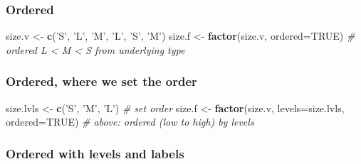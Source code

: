 \documentclass[
]{article}
\newenvironment{Shaded}{\begin{snugshade}}{\end{snugshade}}
\newcommand{\CommentTok}[1]{\textcolor[rgb]{0.56,0.35,0.01}{\textit{#1}}}
\newcommand{\DataTypeTok}[1]{\textcolor[rgb]{0.13,0.29,0.53}{#1}}
\newcommand{\KeywordTok}[1]{\textcolor[rgb]{0.13,0.29,0.53}{\textbf{#1}}}
\newcommand{\NormalTok}[1]{#1}
\newcommand{\OtherTok}[1]{\textcolor[rgb]{0.56,0.35,0.01}{#1}}
\newcommand{\StringTok}[1]{\textcolor[rgb]{0.31,0.60,0.02}{#1}}
\begin{document}
\hypertarget{ordered}{%
\subsubsection{Ordered}\label{ordered}}

\begin{Shaded}
\begin{Highlighting}[]
\NormalTok{size.v <-}\StringTok{ }\KeywordTok{c}\NormalTok{(}\StringTok{'S'}\NormalTok{, }\StringTok{'L'}\NormalTok{, }\StringTok{'M'}\NormalTok{, }\StringTok{'L'}\NormalTok{, }\StringTok{'S'}\NormalTok{, }\StringTok{'M'}\NormalTok{)}
\NormalTok{size.f <-}\StringTok{ }\KeywordTok{factor}\NormalTok{(size.v, }\DataTypeTok{ordered=}\OtherTok{TRUE}\NormalTok{)}
\CommentTok{# ordered L < M < S from underlying type}
\end{Highlighting}
\end{Shaded}

\hypertarget{ordered-where-we-set-the-order}{%
\subsubsection{Ordered, where we set the
order}\label{ordered-where-we-set-the-order}}

\begin{Shaded}
\begin{Highlighting}[]
\NormalTok{size.lvls <-}\StringTok{ }\KeywordTok{c}\NormalTok{(}\StringTok{'S'}\NormalTok{, }\StringTok{'M'}\NormalTok{, }\StringTok{'L'}\NormalTok{) }\CommentTok{# set order}
\NormalTok{size.f <-}\StringTok{ }\KeywordTok{factor}\NormalTok{(size.v, }\DataTypeTok{levels=}\NormalTok{size.lvls, }\DataTypeTok{ordered=}\OtherTok{TRUE}\NormalTok{)}
\CommentTok{# above: ordered (low to high) by levels}
\end{Highlighting}
\end{Shaded}

\hypertarget{ordered-with-levels-and-labels}{%
\subsubsection{Ordered with levels and
labels}\label{ordered-with-levels-and-labels}}
\end{document}
